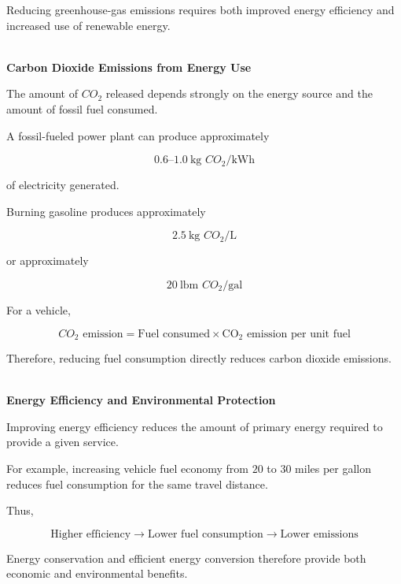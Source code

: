 \documentclass[12pt]{article}
\begin{document}
Reducing greenhouse-gas emissions requires both improved energy efficiency and increased use of renewable energy.

\textbf{\\ Carbon Dioxide Emissions from Energy Use}

The amount of $CO_2$ released depends strongly on the energy source and the amount of fossil fuel consumed.

A fossil-fueled power plant can produce approximately

\begin{equation*}
0.6\text{--}1.0\ \text{kg }CO_2/\text{kWh}
\end{equation*}

of electricity generated.

Burning gasoline produces approximately

\begin{equation*}
2.5\ \text{kg }CO_2/\text{L}
\end{equation*}

or approximately

\begin{equation*}
20\ \text{lbm }CO_2/\text{gal}
\end{equation*}

For a vehicle,

\begin{equation*}
CO_2\text{ emission}
=
\text{Fuel consumed}
\times
\text{CO}_2\text{ emission per unit fuel}
\end{equation*}

Therefore, reducing fuel consumption directly reduces carbon dioxide emissions.

\textbf{\\ Energy Efficiency and Environmental Protection}

Improving energy efficiency reduces the amount of primary energy required to provide a given service.

For example, increasing vehicle fuel economy from $20$ to $30$ miles per gallon reduces fuel consumption for the same travel distance.

Thus,

\begin{equation*}
\text{Higher efficiency}
\longrightarrow
\text{Lower fuel consumption}
\longrightarrow
\text{Lower emissions}
\end{equation*}

Energy conservation and efficient energy conversion therefore provide both economic and environmental benefits.
\end{document}
